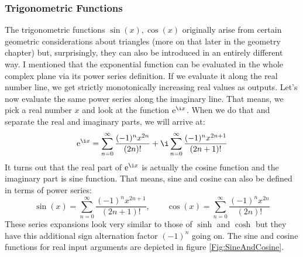 










\subsubsection{Trigonometric Functions}
The trigonometric functions $\sin(x), \cos(x)$ originally arise from certain geometric considerations about triangles (more on that later in the geometry chapter) but, surprisingly, they can also be introduced in an entirely different way. I mentioned that the exponential function can be evaluated in the whole complex plane via its power series definition. If we evaluate it along the real number line, we get strictly monotonically increasing real values as outputs. Let's now evaluate the same power series along the imaginary line. That means, we pick a real number $x$ and look at the function $\e^{\i x}$. When we do that and separate the real and imaginary parts, we will arrive at:
\begin{equation}
\e^{\i x} =      \sum_{n=0}^{\infty} \frac{(-1)^n x^{2n}  }{(2n)!} 
            + \i \sum_{n=0}^{\infty} \frac{(-1)^n x^{2n+1}}{(2n+1)!}
\end{equation}
It turns out that the real part of $\e^{\i x}$ is actually the cosine function and the imaginary part is sine function. That means, sine and cosine can also be defined in terms of power series:
\begin{equation}
\sin(x) = \sum_{n=0}^{\infty} \frac{(-1)^n x^{2n+1}}{(2n+1)!}, \qquad
\cos(x) = \sum_{n=0}^{\infty} \frac{(-1)^n x^{2n}  }{(2n)!}
\end{equation}
These series expansions look very similar to those of $\sinh$ and $\cosh$ but they have this additional sign alternation factor $(-1)^n$ going on. The sine and cosine functions for real input arguments are depicted in figure \ref{Fig:SineAndCosine}.

